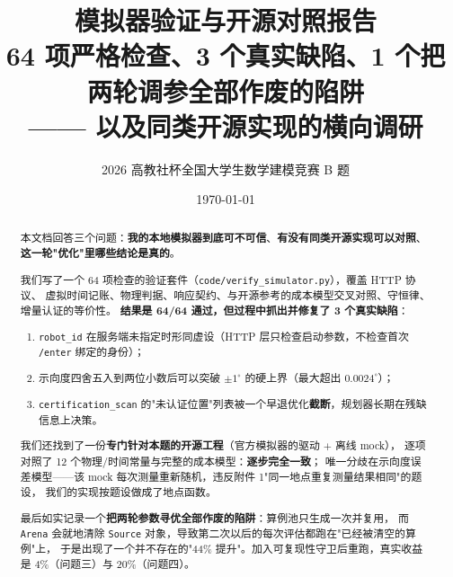 

\title{\heiti 模拟器验证与开源对照报告\\[4pt]
       \large 64 项严格检查、3 个真实缺陷、1 个把两轮调参全部作废的陷阱\\[2pt]
       \normalsize —— 以及同类开源实现的横向调研}
\author{2026 高教社杯全国大学生数学建模竞赛 B 题}
\date{\today}


\maketitle
\thispagestyle{fancy}

\begin{abstract}
\noindent
本文档回答三个问题：\textbf{我的本地模拟器到底可不可信}、\textbf{有没有同类开源实现可以对照}、
\textbf{这一轮"优化"里哪些结论是真的}。

我们写了一个 64 项检查的验证套件（\texttt{code/verify\_simulator.py}），覆盖 HTTP 协议、
虚拟时间记账、物理判据、响应契约、与开源参考的成本模型交叉对照、守恒律、增量认证的等价性。
\textbf{结果是 64/64 通过，但过程中抓出并修复了 3 个真实缺陷}：
\begin{enumerate}[leftmargin=1.8em]
  \item \texttt{robot\_id} 在服务端未指定时形同虚设（HTTP 层只检查启动参数，不检查首次 \texttt{/enter} 绑定的身份）；
  \item 示向度四舍五入到两位小数后可以突破 $\pm1^{\circ}$ 的硬上界（最大超出 $0.0024^{\circ}$）；
  \item \texttt{certification\_scan} 的"未认证位置"列表被一个早退优化\textbf{截断}，规划器长期在残缺信息上决策。
\end{enumerate}

我们还找到了一份\textbf{专门针对本题的开源工程}（官方模拟器的驱动 $+$ 离线 mock），
逐项对照了 12 个物理/时间常量与完整的成本模型：\textbf{逐步完全一致}；
唯一分歧在示向度误差模型——该 mock 每次测量重新随机，违反附件 1"同一地点重复测量结果相同"的题设，
我们的实现按题设做成了地点函数。

最后如实记录一个\textbf{把两轮参数寻优全部作废的陷阱}：算例池只生成一次并复用，
而 \texttt{Arena} 会就地清除 \texttt{Source} 对象，导致第二次以后的每次评估都跑在"已经被清空的算例"上，
于是出现了一个并不存在的"44\% 提升"。加入可复现性守卫后重跑，真实收益是 4\%（问题三）与 20\%（问题四）。
\end{abstract}

\tableofcontents
\newpage

